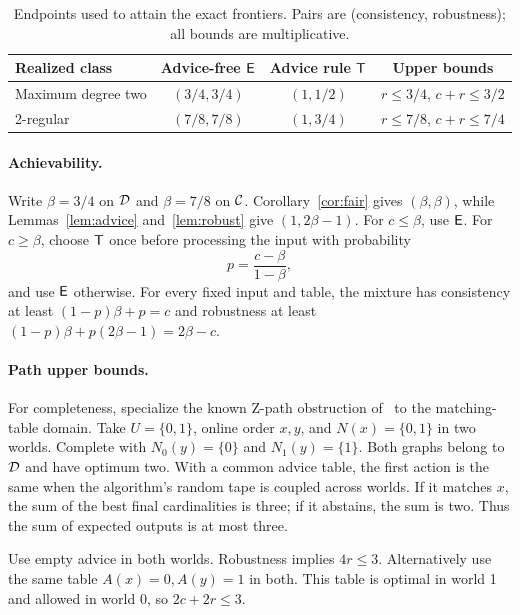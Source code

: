 \begin{table}[ht]
\centering\normalsize
\caption{Endpoints used to attain the exact frontiers. Pairs are
(consistency, robustness); all bounds are multiplicative.}
\label{tab:endpoints}
\begin{tabular}{@{}lccc@{}}
\toprule
Realized class & Advice-free $\mathsf{E}$ & Advice rule $\mathsf{T}$ & Upper bounds\\
\midrule
Maximum degree two & $(3/4,3/4)$ & $(1,1/2)$ & $r\le3/4$, $c+r\le3/2$\\
2-regular & $(7/8,7/8)$ & $(1,3/4)$ & $r\le7/8$, $c+r\le7/4$\\
\bottomrule
\end{tabular}
\end{table}

\paragraph{Achievability.}
Write $\beta=3/4$ on $\mathcal D$ and $\beta=7/8$ on $\mathcal C$.
Corollary~\ref{cor:fair} gives $(\beta,\beta)$, while
Lemmas~\ref{lem:advice} and~\ref{lem:robust} give $(1,2\beta-1)$.
For $c\le\beta$, use $\mathsf{E}$. For $c\ge\beta$, choose $\mathsf{T}$ once
before processing the input with probability
\[
 p=\frac{c-\beta}{1-\beta},
\]
and use $\mathsf{E}$ otherwise. For every fixed input and table, the mixture
has consistency at least $(1-p)\beta+p=c$ and robustness at least
$(1-p)\beta+p(2\beta-1)=2\beta-c$.

\paragraph{Path upper bounds.}
For completeness, specialize the known Z-path obstruction
of~\cite{CGLB24,JM24} to the matching-table domain. Take $U=\{0,1\}$,
online order $x,y$, and $N(x)=\{0,1\}$ in two worlds. Complete with
$N_0(y)=\{0\}$ and $N_1(y)=\{1\}$. Both graphs belong to $\mathcal D$ and have
optimum two. With a common advice table, the first action is the same
when the algorithm's random tape is coupled across worlds. If it matches
$x$, the sum of the best final cardinalities is three; if it abstains,
the sum is two. Thus the sum of expected outputs is at most three.

Use empty advice in both worlds. Robustness implies $4r\le3$.
Alternatively use the same table $A(x)=0,A(y)=1$ in both. This table is
optimal in world 1 and allowed in world 0, so $2c+2r\le3$.

